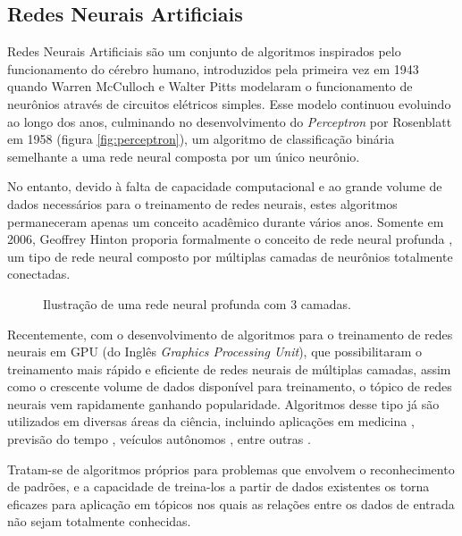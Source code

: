 \subsection{Redes Neurais Artificiais}
\label{sec:ann}

Redes Neurais Artificiais são um conjunto de algoritmos inspirados pelo funcionamento do cérebro humano, introduzidos pela primeira vez em 1943 quando Warren McCulloch e Walter Pitts modelaram o funcionamento de neurônios através de circuitos elétricos simples\cite{mccullochLogicalCalculusIdeas1943}. 
Esse modelo continuou evoluindo ao longo dos anos, culminando no desenvolvimento do \textit{Perceptron} por Rosenblatt em 1958 \cite{rosenblattPerceptronProbabilisticModel1958} (figura \ref{fig:perceptron}), um algoritmo de classificação binária semelhante a uma rede neural composta por um único neurônio.

No entanto, devido à falta de capacidade computacional e ao grande volume de dados necessários para o treinamento de redes neurais, estes algoritmos permaneceram apenas um conceito acadêmico durante vários anos.
Somente em 2006, Geoffrey Hinton proporia formalmente o conceito de rede neural profunda \cite{hintonFastLearningAlgorithm2006}, um tipo de rede neural composto por múltiplas camadas de neurônios totalmente conectadas.

\begin{figure}[ht]
    \centering
    
    \caption{Ilustração de uma rede neural profunda com 3 camadas.}
    \label{fig:dnn}
\end{figure}

Recentemente, com o desenvolvimento de algoritmos para o treinamento de redes neurais em GPU (do Inglês \textit{Graphics Processing Unit}), que possibilitaram o treinamento mais rápido e eficiente de redes neurais de múltiplas camadas, assim como o crescente volume de dados disponível para treinamento, o tópico de redes neurais vem rapidamente ganhando popularidade.
Algoritmos desse tipo já são utilizados em diversas áreas da ciência, incluindo aplicações em medicina \cite{hannunCardiologistLevelArrhythmiaDetection2019,phamPredictingHealthcareTrajectories2017,houDeepSFDeepConvolutional2018}, previsão do tempo \cite{akramSequenceSequenceWeather2016}, veículos autônomos \cite{bojarskiEndEndLearning2016,peddagollaLaneDetectionAutonomous}, entre outras \cite{abiodunStateoftheartArtificialNeural2018}.

Tratam-se de algoritmos próprios para problemas que envolvem o reconhecimento de padrões, e a capacidade de treina-los a partir de dados existentes os torna eficazes para aplicação em tópicos nos quais as relações entre os dados de entrada não sejam totalmente conhecidas.

